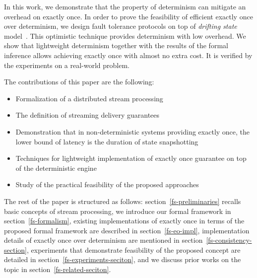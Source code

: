 In this work, we demonstrate that the property of determinism can mitigate an overhead on exactly once. In order to prove the feasibility of efficient exactly once over determinism, we design fault tolerance protocols on top of {\em drifting state} model~\cite{we2018adbis}. This optimistic technique provides determinism with low overhead. We show that lightweight determinism together with the results of the formal inference allows achieving exactly once with almost no extra cost. It is verified by the experiments on a real-world problem.

The contributions of this paper are the following: 
\begin{itemize}
    \item Formalization of a distributed stream processing
    \item The definition of streaming delivery guarantees 
    \item Demonstration that in non-deterministic systems providing exactly once, the lower bound of latency is the duration of state snapshotting
    \item Techniques for lightweight implementation of exactly once guarantee on top of the deterministic engine
    \item Study of the practical feasibility of the proposed approaches
\end{itemize}

The rest of the paper is structured as follows: section~\ref{fs-preliminaries} recalls basic concepts of stream processing, we introduce our formal framework in section~\ref{fs-formalism}, existing implementations of exactly once in terms of the proposed formal framework are described in section~\ref{fs-eo-impl}, implementation details of exactly once over determinism are mentioned in section~\ref{fs-consistency-section}, experiments that demonstrate feasibility of the proposed concept are detailed in section~\ref{fs-experiments-seciton}, and we discuss prior works on the topic in section~\ref{fs-related-seciton}. 

